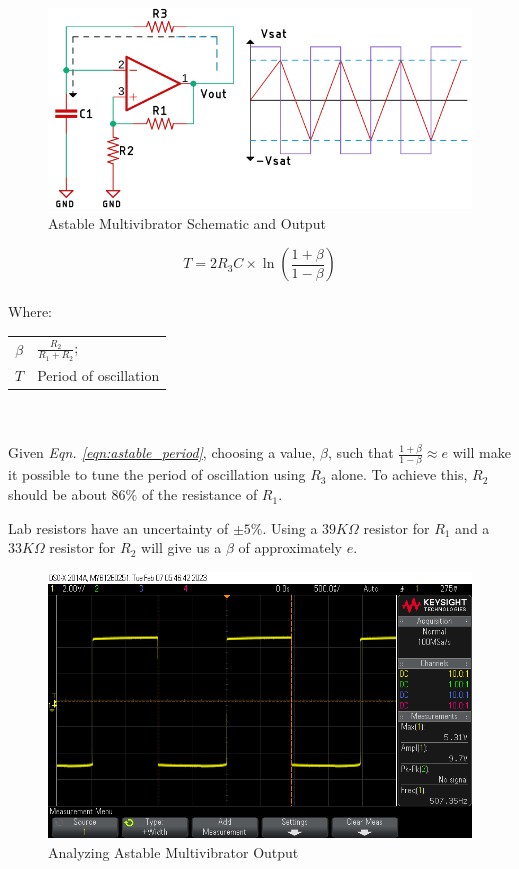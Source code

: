 \documentclass[journal]{IEEEtran}
\begin{document}
\begin{figure}[h]
    \includegraphics[scale=0.3]{Media/Op-amp-Astable-Multivibrator-Working.png}
    \caption[short]{Astable Multivibrator Schematic and Output}
    \label{fig:sch_multivibrator}
\end{figure}

\begin{equation}
    T = 2R_3C \times \ln\left({\frac{1+\beta}{1-\beta}}\right)
    \label{eqn:astable_period}
\end{equation}
\\
Where:
\begin{tabularx}{\linewidth}{>{$}r<{$} @{${}={}$} X}
    \beta & $\frac{R_2}{R_1 + R_2}$;\\
    T & Period of oscillation\\
\end{tabularx}
\\
\\

Given \textit{Eqn. \ref{eqn:astable_period}}, choosing a value, $\beta$, such that $\frac{1+\beta}{1-\beta} \approx  e$ will make it possible to tune the period of oscillation using $R_3$ alone. To achieve this, $R_2$ should be about $86\%$ of the resistance of $R_1$.

Lab resistors have an uncertainty of $\pm5\%$. Using a $39 K\Omega$ resistor for $R_1$ and a $33 K\Omega$ resistor for $R_2$ will give us a $\beta$ of approximately $e$. 

\begin{figure}[h]
    \includegraphics[scale=0.3]{Media/astable_500hz.png}
    \caption[short]{Analyzing Astable Multivibrator Output}
    \label{fig:osc_multivibrator}
\end{figure}
\end{document}
